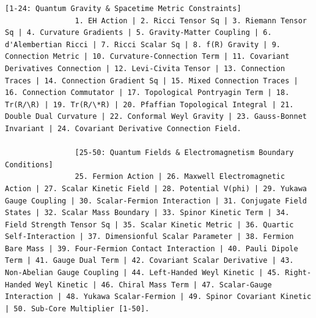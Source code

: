 \documentclass[11pt,a4paper]{article}
\makeatletter
\def\ttfamily{\@noligs\fontfamily\ttdefault\selectfont\sloppy}
\makeatother
\begin{document}
\begin{tcolorbox}
\begin{lstlisting}[basicstyle=\scriptsize\ttfamily, breaklines=true, columns=fullflexible]
				[1-24: Quantum Gravity & Spacetime Metric Constraints]
				1. EH Action | 2. Ricci Tensor Sq | 3. Riemann Tensor Sq | 4. Curvature Gradients | 5. Gravity-Matter Coupling | 6. d'Alembertian Ricci | 7. Ricci Scalar Sq | 8. f(R) Gravity | 9. Connection Metric | 10. Curvature-Connection Term | 11. Covariant Derivatives Connection | 12. Levi-Civita Tensor | 13. Connection Traces | 14. Connection Gradient Sq | 15. Mixed Connection Traces | 16. Connection Commutator | 17. Topological Pontryagin Term | 18. Tr(R/\R) | 19. Tr(R/\*R) | 20. Pfaffian Topological Integral | 21. Double Dual Curvature | 22. Conformal Weyl Gravity | 23. Gauss-Bonnet Invariant | 24. Covariant Derivative Connection Field.
				
				[25-50: Quantum Fields & Electromagnetism Boundary Conditions]
				25. Fermion Action | 26. Maxwell Electromagnetic Action | 27. Scalar Kinetic Field | 28. Potential V(phi) | 29. Yukawa Gauge Coupling | 30. Scalar-Fermion Interaction | 31. Conjugate Field States | 32. Scalar Mass Boundary | 33. Spinor Kinetic Term | 34. Field Strength Tensor Sq | 35. Scalar Kinetic Metric | 36. Quartic Self-Interaction | 37. Dimensionful Scalar Parameter | 38. Fermion Bare Mass | 39. Four-Fermion Contact Interaction | 40. Pauli Dipole Term | 41. Gauge Dual Term | 42. Covariant Scalar Derivative | 43. Non-Abelian Gauge Coupling | 44. Left-Handed Weyl Kinetic | 45. Right-Handed Weyl Kinetic | 46. Chiral Mass Term | 47. Scalar-Gauge Interaction | 48. Yukawa Scalar-Fermion | 49. Spinor Covariant Kinetic | 50. Sub-Core Multiplier [1-50].
				

\end{lstlisting}
\end{tcolorbox}
\end{document}
